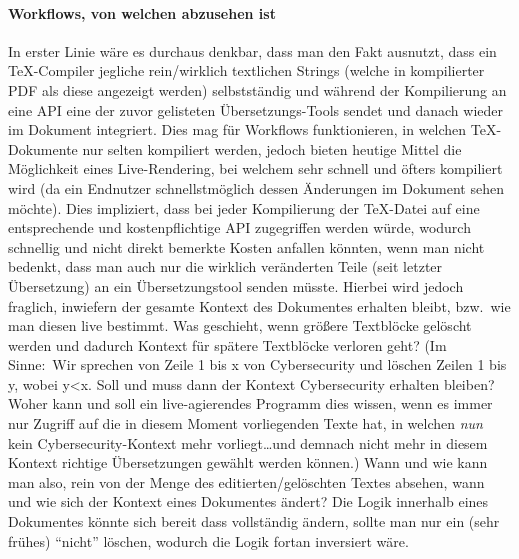 \paragraph*{Workflows, von welchen abzusehen ist}%
In erster Linie wäre es durchaus denkbar, dass man den Fakt ausnutzt, dass ein \TeX{}-Compiler jegliche rein/wirklich textlichen Strings (welche in kompilierter PDF als diese angezeigt werden) selbstständig und während der Kompilierung an eine API eine der zuvor gelisteten Übersetzungs-Tools sendet und danach wieder im Dokument integriert. Dies mag für Workflows funktionieren, in welchen \TeX{}-Dokumente nur selten kompiliert werden, jedoch bieten heutige Mittel die Möglichkeit eines Live-Rendering, bei welchem sehr schnell und öfters kompiliert wird (da ein Endnutzer schnellstmöglich dessen Änderungen im Dokument sehen möchte). Dies impliziert, dass bei jeder Kompilierung der \TeX{}-Datei auf eine entsprechende und kostenpflichtige API zugegriffen werden würde, wodurch schnellig und nicht direkt bemerkte Kosten anfallen könnten, wenn man nicht bedenkt, dass man auch nur die wirklich veränderten Teile (seit letzter Übersetzung) an ein Übersetzungstool senden müsste. Hierbei wird jedoch fraglich, inwiefern der gesamte Kontext des Dokumentes erhalten bleibt, bzw.\ wie man diesen live bestimmt. Was geschieht, wenn größere Textblöcke gelöscht werden und dadurch Kontext für spätere Textblöcke verloren geht? (Im Sinne:\ Wir sprechen von Zeile 1 bis x von Cybersecurity und löschen Zeilen 1 bis y, wobei y<x. Soll und muss dann der Kontext Cybersecurity erhalten bleiben? Woher kann und soll ein live-agierendes Programm dies wissen, wenn es immer nur Zugriff auf die in diesem Moment vorliegenden Texte hat, in welchen \textit{nun} kein Cybersecurity-Kontext mehr vorliegt\ldots und demnach nicht mehr in diesem Kontext richtige Übersetzungen gewählt werden können.)%
Wann und wie kann man also, rein von der Menge des editierten/gelöschten Textes absehen, wann und wie sich der Kontext eines Dokumentes ändert? Die Logik innerhalb eines Dokumentes könnte sich bereit dass vollständig ändern, sollte man nur ein (sehr frühes) \enquote{nicht} löschen, wodurch die Logik fortan inversiert wäre.


